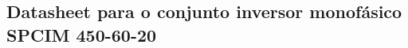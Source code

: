 \documentclass[
	article,			%
	12pt,				%
	twoside,			%
	a4paper,			%
	english,			%
	brazil,				%
	sumario=tradicional
	]{abntex2-modelo-notas-de-aula}
\begin{document}
\newpage
\begin{anexosenv}

\chapter{Datasheet para o conjunto inversor monofásico SPCIM 450-60-20}



\end{anexosenv}
\end{document}

